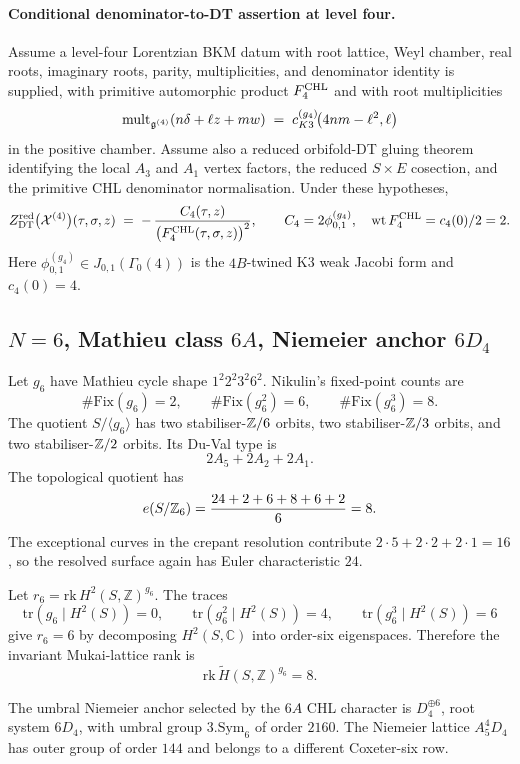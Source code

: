 \paragraph{Conditional denominator-to-DT assertion at level four.}
Assume a level-four Lorentzian BKM datum with root lattice, Weyl chamber,
real roots, imaginary roots, parity, multiplicities, and denominator
identity is supplied, with primitive automorphic product $F^{\mathrm{CHL}}_4$ and
with root multiplicities
\[
\mathrm{mult}_{\mathfrak{g}^{(4)}}(n\delta+\ell z+mw)
\;=\;c^{(g_4)}_{K3}\!\bigl(4nm-\ell^2,\ell\bigr)
\]
in the positive chamber. Assume also a reduced orbifold-DT gluing theorem
identifying the local $A_3$ and $A_1$ vertex factors, the reduced
$S\times E$ cosection, and the primitive CHL denominator normalisation.
Under these hypotheses,
\begin{equation}
Z^{\mathrm{red}}_{\mathrm{DT}}\bigl(\mathcal{X}^{(4)}\bigr)(\tau,\sigma,z)
\;=\;-\,\frac{C_4(\tau,z)}{\bigl(F^{\mathrm{CHL}}_{4}(\tau,\sigma,z)\bigr)^2},
\qquad
C_4=2\phi^{(g_4)}_{0,1},\quad
\mathrm{wt}\,F^{\mathrm{CHL}}_4=c_4(0)/2=2 .
\label{wn:eq:N4-DTred}
\end{equation}
Here $\phi^{(g_4)}_{0,1}\in J_{0,1}(\Gamma_0(4))$ is the $4B$-twined K3
weak Jacobi form and $c_4(0)=4$.

\subsection*{$N=6$, Mathieu class $6A$, Niemeier anchor $6D_4$}

Let $g_6$ have Mathieu cycle shape $1^{2}2^{2}3^{2}6^{2}$. Nikulin's
fixed-point counts are
\[
  \#\mathrm{Fix}(g_6)=2,\qquad
  \#\mathrm{Fix}(g_6^2)=6,\qquad
  \#\mathrm{Fix}(g_6^3)=8 .
\]
The quotient $S/\langle g_6\rangle$ has two stabiliser-$\mathbb{Z}/6$ orbits,
two stabiliser-$\mathbb{Z}/3$ orbits, and two stabiliser-$\mathbb{Z}/2$ orbits. Its
Du-Val type is
\[
  2A_5+2A_2+2A_1 .
\]
The topological quotient has
\[
  e(S/\mathbb{Z}_6)=\frac{24+2+6+8+6+2}{6}=8.
\]
The exceptional curves in the crepant resolution contribute
$2\cdot5+2\cdot2+2\cdot1=16$, so the resolved surface again has Euler
characteristic $24$.

Let $r_6=\mathrm{rk}\,H^2(S,\mathbb{Z})^{g_6}$. The traces
\[
  \mathrm{tr}(g_6\mid H^2(S))=0,\qquad
  \mathrm{tr}(g_6^2\mid H^2(S))=4,\qquad
  \mathrm{tr}(g_6^3\mid H^2(S))=6
\]
give $r_6=6$ by decomposing $H^2(S,\mathbb{C})$ into order-six
eigenspaces. Therefore the invariant Mukai-lattice rank is
\[
  \mathrm{rk}\,\widetilde H(S,\mathbb{Z})^{g_6}=8 .
\]

The umbral Niemeier anchor selected by the $6A$ CHL character is
$D_4^{\oplus6}$, root system $6D_4$, with umbral group
$3.\mathrm{Sym}_6$ of order $2160$. The Niemeier lattice $A_5^4D_4$ has
outer group of order $144$ and belongs to a different Coxeter-six row.

